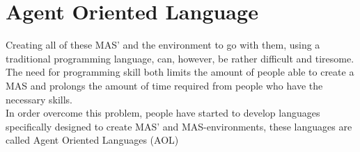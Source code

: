 \section{Agent Oriented Language}
Creating all of these MAS' and the environment to go with them, using a traditional programming language, can, however, be rather difficult and tiresome. The need for programming skill both limits the amount of people able to create a MAS and prolongs the amount of time required from people who have the necessary skills.\\
\indent In order overcome this problem, people have started to develop languages specifically designed to create MAS' and MAS-environments, these languages are called Agent Oriented Languages (AOL)